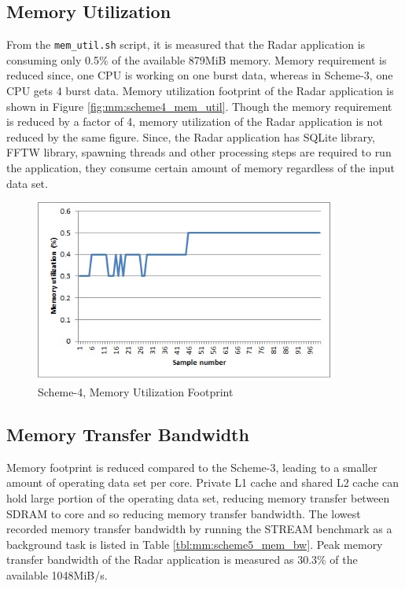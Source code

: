 \subsection{Memory Utilization}
\label{ss:mm:scheme5:mem_util}
From the \verb|mem_util.sh| script, it is measured that the Radar application is consuming only 0.5\% of the available 879MiB memory. Memory requirement is reduced since, one CPU is working on one burst data, whereas in Scheme-3, one CPU gets 4 burst data. Memory utilization footprint of the Radar application is shown in Figure \ref{fig:mm:scheme4_mem_util}. Though the memory requirement is reduced by a factor of 4, memory utilization of the Radar application is not reduced by the same figure. Since, the Radar application has SQLite library, FFTW library, spawning threads and other processing steps are required to run the application, they consume certain amount of memory regardless of the input data set.

\begin{figure}[h!]
	\centering
	\includegraphics[width=100mm]{figures/scheme5_mem_util}
	\caption{Scheme-4, Memory Utilization Footprint}
	\label{fig:mm:scheme5_mem_util}
\end{figure}


\subsection{Memory Transfer Bandwidth}
\label{ss:mm:scheme5:bw_util}
Memory footprint is reduced compared to the Scheme-3, leading to a smaller amount of operating data set per core. Private L1 cache and shared L2 cache can hold large portion of the operating data set, reducing memory transfer between SDRAM to core and so reducing memory transfer bandwidth. The lowest recorded memory transfer bandwidth by running the STREAM benchmark as a background task is listed in Table \ref{tbl:mm:scheme5_mem_bw}. Peak memory transfer bandwidth of the Radar application is measured as 30.3\% of the available 1048MiB/s.

